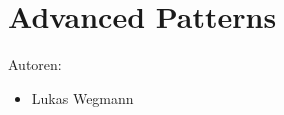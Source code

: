 \chapter{Advanced Patterns}
\label{sec:advancedPatterns}

Autoren:
\begin{itemize}
	\item Lukas Wegmann
\end{itemize}


